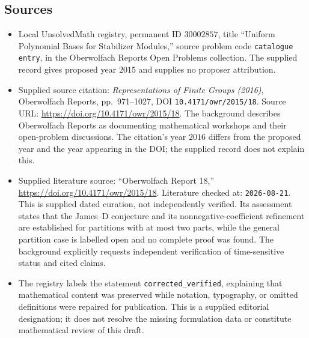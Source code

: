 \documentclass[11pt]{article}
\begin{document}
\subsection{Sources}
\begin{itemize}
\item Local UnsolvedMath registry, permanent ID \(30002857\), title ``Uniform Polynomial Bases for Stabilizer Modules,'' source problem code \texttt{catalogue entry}, in the Oberwolfach Reports Open Problems collection. The supplied record gives proposed year \(2015\) and supplies no proposer attribution.
\item Supplied source citation: \emph{Representations of Finite Groups (2016)}, Oberwolfach Reports, pp.~971--1027, DOI \texttt{10.4171/owr/2015/18}. Source URL: \url{https://doi.org/10.4171/owr/2015/18}. The background describes Oberwolfach Reports as documenting mathematical workshops and their open-problem discussions. The citation's year \(2016\) differs from the proposed year and the year appearing in the DOI; the supplied record does not explain this.
\item Supplied literature source: ``Oberwolfach Report 18,'' \url{https://doi.org/10.4171/owr/2015/18}. Literature checked at: \texttt{2026-08-21}. This is supplied dated curation, not independently verified. Its assessment states that the James--D conjecture and its nonnegative-coefficient refinement are established for partitions with at most two parts, while the general partition case is labelled open and no complete proof was found. The background explicitly requests independent verification of time-sensitive status and cited claims.
\item The registry labels the statement \texttt{corrected\_verified}, explaining that mathematical content was preserved while notation, typography, or omitted definitions were repaired for publication. This is a supplied editorial designation; it does not resolve the missing formulation data or constitute mathematical review of this draft.
\end{itemize}
\end{document}
